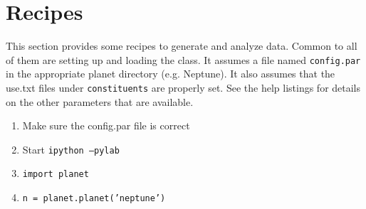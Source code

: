 \documentclass[11pt]{article}
\begin{document}
\section{Recipes}
This section provides some recipes to generate and analyze data.  Common to all of them are setting up and loading the class.  It assumes a file named \texttt{config.par} in the appropriate planet directory (e.g. Neptune).  It also assumes that the use.txt files under \texttt{constituents} are properly set.  See the help listings for details on the other parameters that are available.
\begin{enumerate}
\item Make sure the config.par file is correct
\item Start \texttt{ipython --pylab}
\item \texttt{import planet}
\item \texttt{n = planet.planet('neptune')}
\end{enumerate}
\end{document}
